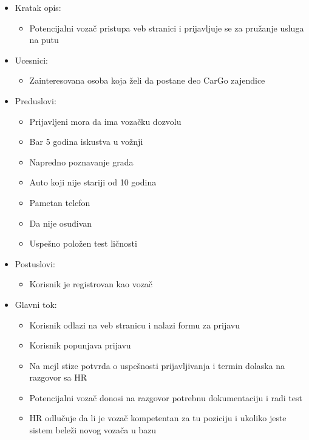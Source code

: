 \begin{itemize}
	\item Kratak opis:
		\begin{itemize}
			\item Potencijalni vozač pristupa veb stranici i prijavljuje se za pružanje usluga na putu
		\end{itemize}
 
	\item Ucesnici:
		\begin{itemize}
			\item Zainteresovana osoba koja želi da postane deo CarGo zajendice		
		\end{itemize}				

	\item Preduslovi:
		\begin{itemize}
		    \item Prijavljeni mora da ima vozačku dozvolu
		    \item Bar 5 godina iskustva u vožnji
		    \item Napredno poznavanje grada
		    \item Auto koji nije stariji od 10 godina
		    \item Pametan telefon
		    \item Da nije osuđivan
		    \item Uspešno položen test ličnosti
		\end{itemize}

	\item Postuslovi:
		\begin{itemize}
			\item Korisnik je registrovan kao vozač
		\end{itemize}		


	\item Glavni tok:
		\begin{itemize}
		    \item Korisnik odlazi na veb stranicu i nalazi formu za prijavu
		    \item Korisnik popunjava prijavu
		    \item Na mejl stize potvrda o uspešnosti prijavljivanja i termin dolaska na razgovor sa HR
		    \item Potencijalni vozač donosi na razgovor potrebnu dokumentaciju i radi test
		    \item HR odlučuje da li je vozač kompetentan za tu poziciju i ukoliko jeste sistem beleži novog vozača u bazu
		\end{itemize}


\end{itemize}
